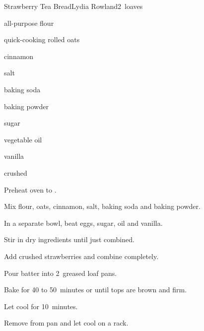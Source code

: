 \begin{recipe}{Strawberry Tea Bread}{Lydia Rowland}{2~loaves}

\begin{ingredients}
\item {} all-purpose flour
\item \C{1\half} quick-cooking rolled oats
\item {} cinnamon
\item {} salt
\item {} baking soda
\item \tp{\half} baking powder
\item {} sugar
\item {} vegetable oil
\item {} vanilla
\item {} crushed 
\end{ingredients}

\begin{directions}
\item Preheat oven to .
\item Mix flour, oats, cinnamon, salt, baking soda and baking powder.
\item In a separate bowl, beat eggs, sugar, oil and vanilla.
\item Stir in dry ingredients until just combined.
\item Add crushed strawberries and combine completely.
\item Pour batter into 2~greased loaf pans.
\item Bake for 40 to 50~minutes or until tops are brown and firm.
\item Let cool for 10~minutes.
\item Remove from pan and let cool on a rack.
\end{directions}

\end{recipe}
